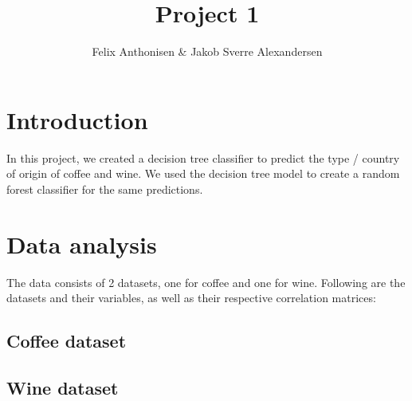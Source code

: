 \documentclass[11pt]{article}
\title{Project 1 }
\author{Felix Anthonisen & Jakob Sverre Alexandersen}
\begin{document}
    
    \maketitle
    
    

    \section{Introduction}\label{introduction}

In this project, we created a decision tree classifier to predict the
type / country of origin of coffee and wine. We used the decision tree
model to create a random forest classifier for the same predictions.

    \section{Data analysis}\label{data-analysis}

The data consists of 2 datasets, one for coffee and one for wine. 
Following are the datasets and their variables, as well as their respective
correlation matrices:

\subsection{Coffee dataset}\label{coffee-dataset}



    \begin{center}
    \end{center}
    
    


    \begin{center}
    \end{center}
    
    
\subsection{Wine dataset}\label{wine-dataset}



    \begin{center}
    \end{center}
    
\end{document}
